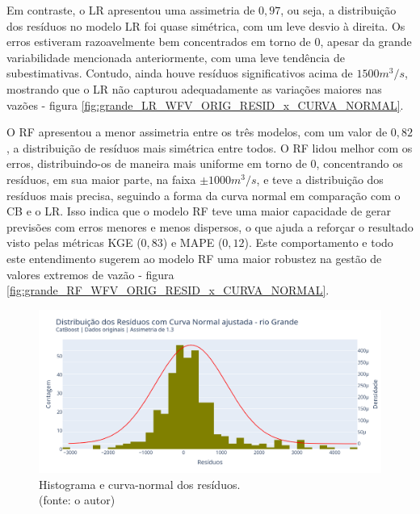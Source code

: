 Em contraste, o LR apresentou uma assimetria de $0,97$, ou seja, a distribuição dos resíduos no modelo LR foi quase simétrica, com um leve desvio à direita. Os erros estiveram razoavelmente bem concentrados em torno de $0$, apesar da grande variabilidade mencionada anteriormente, com uma leve tendência de subestimativas. Contudo, ainda houve resíduos significativos acima de $1500 m^3/s$, mostrando que o LR não capturou adequadamente as variações maiores nas vazões - figura \ref{fig:grande_LR_WFV_ORIG_RESID_x_CURVA_NORMAL}.

O RF apresentou a menor assimetria entre os três modelos, com um valor de $0,82$, a distribuição de resíduos mais simétrica entre todos. O RF lidou melhor com os erros, distribuindo-os de maneira mais uniforme em torno de $0$, concentrando os resíduos, em sua maior parte, na faixa $\pm 1000 m^3/s$, e teve a distribuição dos resíduos mais precisa, seguindo a forma da curva normal em comparação com o CB e o LR. Isso indica que o modelo RF teve uma maior capacidade de gerar previsões com erros menores e menos dispersos, o que ajuda a reforçar o resultado visto pelas métricas KGE ($0,83$) e MAPE ($0,12$). Este comportamento e todo este entendimento sugerem ao modelo RF uma maior robustez na gestão de valores extremos de vazão - figura \ref{fig:grande_RF_WFV_ORIG_RESID_x_CURVA_NORMAL}.

\begin{figure}[!h]
	\centering
	\includegraphics[scale=0.33]{Figuras/rio_grande/wfv/CB/CB_WFV_ORIG_RESID_x_CURVA_NORMAL.png}
	\caption{Histograma e curva-normal dos resíduos.\\(fonte: o autor)}
	\label{fig:grande_CB_WFV_ORIG_RESID_x_CURVA_NORMAL}
\end{figure}

